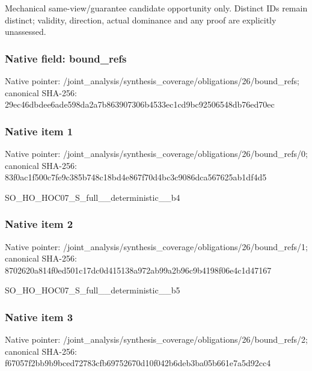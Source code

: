 \documentclass[10pt,a4paper]{article}
\begin{document}
\begingroup\raggedright\sloppy Mechanical same-view/\allowbreak{}guarantee candidate opportunity only. Distinct IDs remain distinct;\allowbreak{} validity,\allowbreak{} direction,\allowbreak{} actual dominance and any proof are explicitly unassessed.\par\endgroup

\subsubsection{Native field: bound\_\allowbreak{}refs}
Native pointer: /joint\_\allowbreak{}analysis/synthesis\_\allowbreak{}coverage/obligations/26/bound\_\allowbreak{}refs; canonical SHA-256: 29ec46dbdee6ade598da2a7b863907306b4533ec1cd9bc92506548db76ed70ec

\subsubsection{Native item 1}
Native pointer: /joint\_\allowbreak{}analysis/synthesis\_\allowbreak{}coverage/obligations/26/bound\_\allowbreak{}refs/0; canonical SHA-256: 83f0ac1f500c7fe9c385b748c18bd4e867f70d4bc3c9086dca567625ab1df4d5

\begingroup\raggedright\sloppy SO\_\allowbreak{}HO\_\allowbreak{}HOC07\_\allowbreak{}S\_\allowbreak{}full\_\allowbreak{}\_\allowbreak{}deterministic\_\allowbreak{}\_\allowbreak{}b4\par\endgroup

\subsubsection{Native item 2}
Native pointer: /joint\_\allowbreak{}analysis/synthesis\_\allowbreak{}coverage/obligations/26/bound\_\allowbreak{}refs/1; canonical SHA-256: 8702620a814f0ed501c17dc0d415138a972ab99a2b96c9b4198f06e4c1d47167

\begingroup\raggedright\sloppy SO\_\allowbreak{}HO\_\allowbreak{}HOC07\_\allowbreak{}S\_\allowbreak{}full\_\allowbreak{}\_\allowbreak{}deterministic\_\allowbreak{}\_\allowbreak{}b5\par\endgroup

\subsubsection{Native item 3}
Native pointer: /joint\_\allowbreak{}analysis/synthesis\_\allowbreak{}coverage/obligations/26/bound\_\allowbreak{}refs/2; canonical SHA-256: f67057f2bb9b9bced72783cfb69752670d10f042b6deb3ba05b661e7a5d92cc4
\end{document}
